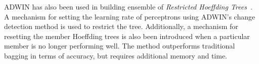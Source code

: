 ADWIN has also been used in building ensemble of \textit{Restricted Hoeffding Trees}~\cite{bifet10:rht}. A mechanism for setting the learning rate of perceptrons using ADWIN's change detection method is used to restrict the tree. Additionally, a mechanism for resetting the member Hoeffding trees is also been introduced when a particular member is no longer performing well. The method outperforms traditional bagging in terms of accuracy, but requires additional memory and time.

